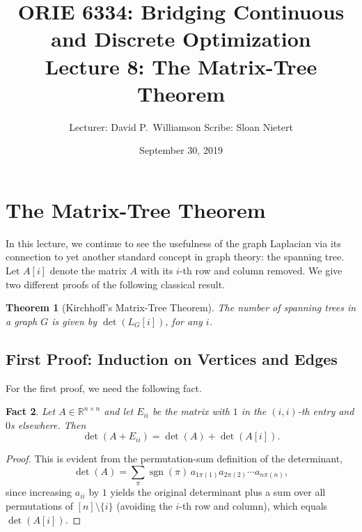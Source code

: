 \documentclass[12pt]{article}
\title{ORIE 6334: Bridging Continuous and Discrete Optimization\\[0.4em]
\large Lecture 8: The Matrix-Tree Theorem}
\author{Lecturer: David P.\ Williamson \quad Scribe: Sloan Nietert}
\date{September 30, 2019}
\newtheorem{theorem}{Theorem}
\newtheorem{fact}[theorem]{Fact}
\theoremstyle{remark}
\newcommand{\R}{\mathbb{R}}
\begin{document}
\maketitle

\section{The Matrix-Tree Theorem}

In this lecture, we continue to see the usefulness of the graph Laplacian via its connection
to yet another standard concept in graph theory: the spanning tree. Let $A[i]$ denote the
matrix $A$ with its $i$-th row and column removed. We give two different proofs of the
following classical result.

\begin{theorem}[Kirchhoff's Matrix-Tree Theorem]
The number of spanning trees in a graph $G$ is given by $\det(L_G[i])$, for any $i$.
\end{theorem}

\subsection*{First Proof: Induction on Vertices and Edges}

For the first proof, we need the following fact.

\begin{fact}
\label{fact:det-rank1}
Let $A \in \R^{n \times n}$ and let $E_{ii}$ be the matrix with $1$ in the $(i,i)$-th entry
and $0$s elsewhere. Then
\[
  \det(A + E_{ii}) = \det(A) + \det(A[i]).
\]
\end{fact}

\begin{proof}
This is evident from the permutation-sum definition of the determinant,
\[
  \det(A) = \sum_\pi \operatorname{sgn}(\pi)\, a_{1\pi(1)} a_{2\pi(2)} \cdots a_{n\pi(n)},
\]
since increasing $a_{ii}$ by $1$ yields the original determinant plus a sum over all
permutations of $[n] \setminus \{i\}$ (avoiding the $i$-th row and column), which equals
$\det(A[i])$.
\end{proof}
\end{document}
